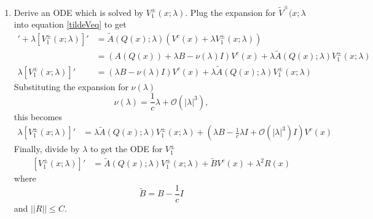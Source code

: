 \documentclass[thesis.tex]{subfiles}
\begin{document}
\begin{enumerate}
\item Derive an ODE which is solved by $V_1^\pm(x; \lambda)$.
Plug the expansion for $\tilde{V}^\pm(x; \lambda$ into equation \eqref{tildeVeq} to get
\begin{align*}
[V^c(x)]' + \lambda [V_1^\pm(x; \lambda)]'
&= \tilde{A}(Q(x); \lambda)(V^c(x) + \lambda V_1^\pm(x; \lambda)) \\
&= (A(Q(x)) + \lambda B - \nu(\lambda)I)V^c(x) + \lambda \tilde{A}(Q(x); \lambda) V_1^\pm(x; \lambda) \\
\lambda [V_1^\pm(x; \lambda)]' &= (\lambda B - \nu(\lambda)I)V^c(x) + \lambda \tilde{A}(Q(x); \lambda) V_1^\pm(x; \lambda)
\end{align*}
Substituting the expansion for $\nu(\lambda)$
\[
\nu(\lambda) = \frac{1}{c} \lambda + \mathcal{O}(|\lambda|^3),
\]
this becomes
\begin{align*}
\lambda [V_1^\pm(x; \lambda)]' &= \lambda \tilde{A}(Q(x); \lambda) V_1^\pm(x; \lambda) + \left(\lambda B - \frac{1}{c} \lambda I + \mathcal{O}(|\lambda|^3)I\right)V^c(x)
\end{align*}
Finally, divide by $\lambda$ to get the ODE for $V_1^\pm$
\begin{align}\label{V1eq}
[V_1^\pm(x; \lambda)]' &= \tilde{A}(Q(x); \lambda) V_1^\pm(x; \lambda) + \tilde{B} V^c(x) + \lambda^2 R(x)
\end{align}
where
\[
\tilde{B} = B - \frac{1}{c} I
\]
and $||R|| \leq C$. 


\end{enumerate}
\end{document}
